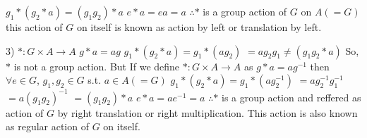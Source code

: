 $g_1 * (g_2 * a) = (g_1 g_2) * a$
$e * a = ea = a$
$\therefore *$ is a group action of $G$ on $A(=G)$
this action of $G$ on itself is known as action by left or translation by left.

3) $*: G \times A \to A$
$g * a = ag$
$g_1 * (g_2 * a) = g_1 * (ag_2)$
$= ag_2 g_1 \neq (g_1 g_2 * a)$
So, $*$ is not a group action.
But
If we define $*: G \times A \to A$ as
$g * a = ag^{-1}$
then $\forall e \in G$, $g_1, g_2 \in G$ s.t. $a \in A(=G)$
$g_1 * (g_2 * a) = g_1 * (ag_2^{-1})$
$= ag_2^{-1} g_1^{-1}$
$= a(g_1 g_2)^{-1}$
$= (g_1 g_2) * a$
$e * a = ae^{-1} = a$
$\therefore *$ is a group action and reffered as action of $G$ by right translation or right multiplication.
This action is also known as regular action of $G$ on itself.
